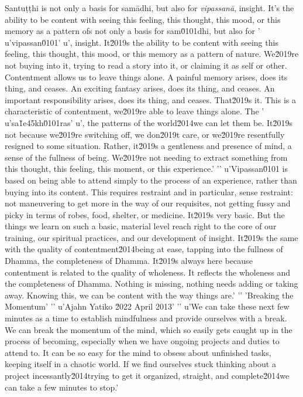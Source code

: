 Santuṭṭhi is not only a basis for samādhi, but also for 
\emph{vipassanā}, insight. It's the ability to be content with seeing 
this feeling, this thought, this mood, or this memory as a pattern ofs not only a basis for sam\u0101dhi, but also for '
u'vipassan\u0101'
u', insight. It\u2019s the ability to be content with seeing this feeling, this thought, this mood, or this memory as a pattern of nature. We\u2019re not buying into it, trying to read a story into it, or claiming it as self or other. Contentment allows us to leave things alone. A painful memory arises, does its thing, and ceases. An exciting fantasy arises, does its thing, and ceases. An important responsibility arises, does its thing, and ceases. That\u2019s it. This is a characteristic of contentment, we\u2019re able to leave things alone. The '
u'sa\u1e45kh\u0101ras'
u', the patterns of the world\u2014we can let them be. It\u2019s not because we\u2019re switching off, we don\u2019t care, or we\u2019re resentfully resigned to some situation. Rather, it\u2019s a gentleness and presence of mind, a sense of the fullness of being. We\u2019re not needing to extract something from this thought, this feeling, this moment, or this experience.'
'\n'
u'Vipassan\u0101 is based on being able to attend simply to the process of an experience, rather than buying into its content. This requires restraint and in particular, sense restraint: not maneuvering to get more in the way of our requisites, not getting fussy and picky in terms of robes, food, shelter, or medicine. It\u2019s very basic. But the things we learn on such a basic, material level reach right to the core of our training, our spiritual practices, and our development of insight. It\u2019s the same with the quality of contentment\u2014being at ease, tapping into the fullness of Dhamma, the completeness of Dhamma. It\u2019s always here because contentment is related to the quality of wholeness. It reflects the wholeness and the completeness of Dhamma. Nothing is missing, nothing needs adding or taking away. Knowing this, we can be content with the way things are.'
'\n'
'Breaking the Momentum'
'\n'
u'Ajahn Yatiko \u2022 April 2013'
'\n'
u'We can take these next few minutes as a time to establish mindfulness and provide ourselves with a break. We can break the momentum of the mind, which so easily gets caught up in the process of becoming, especially when we have ongoing projects and duties to attend to. It can be so easy for the mind to obsess about unfinished tasks, keeping itself in a chaotic world. If we find ourselves stuck thinking about a project incessantly\u2014trying to get it organized, straight, and complete\u2014we can take a few minutes to stop.'
